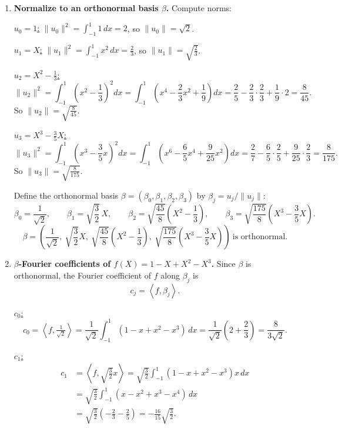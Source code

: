 \documentclass[12pt]{article}
\newcommand{\ip}[2]{\left\langle #1,#2\right\rangle}
\begin{document}
\begin{enumerate}[label=(\alph*)]
Thus Gram--Schmidt yields the orthogonal list
\[
\boxed{\,\bigl(1,\ X,\ X^2-\tfrac13,\ X^3-\tfrac35 X\bigr).\,}
\]

\item \textbf{Normalize to an orthonormal basis $\beta$.}
Compute norms:

\underline{$u_0=1$:} $\|u_0\|^2=\int_{-1}^1 1\,dx=2$, so $\|u_0\|=\sqrt2$.

\underline{$u_1=X$:} $\|u_1\|^2=\int_{-1}^1 x^2\,dx=\frac{2}{3}$, so $\|u_1\|=\sqrt{\frac{2}{3}}$.

\underline{$u_2=X^2-\frac13$:}
\[
\|u_2\|^2=\int_{-1}^1 \left(x^2-\frac13\right)^2dx
=\int_{-1}^1\left(x^4-\frac{2}{3}x^2+\frac{1}{9}\right)dx
=\frac{2}{5}-\frac{2}{3}\cdot\frac{2}{3}+\frac{1}{9}\cdot 2
=\frac{8}{45}.
\]
So $\|u_2\|=\sqrt{\frac{8}{45}}$.

\underline{$u_3=X^3-\frac35 X$:}
\[
\|u_3\|^2=\int_{-1}^1\left(x^3-\frac{3}{5}x\right)^2dx
=\int_{-1}^1\left(x^6-\frac{6}{5}x^4+\frac{9}{25}x^2\right)dx
=\frac{2}{7}-\frac{6}{5}\cdot\frac{2}{5}+\frac{9}{25}\cdot\frac{2}{3}
=\frac{8}{175}.
\]
So $\|u_3\|=\sqrt{\frac{8}{175}}$.

Define the orthonormal basis $\beta=(\beta_0,\beta_1,\beta_2,\beta_3)$ by $\beta_j=u_j/\|u_j\|$:
\[
\beta_0=\frac{1}{\sqrt2},\qquad
\beta_1=\sqrt{\frac{3}{2}}\,X,\qquad
\beta_2=\sqrt{\frac{45}{8}}\left(X^2-\frac13\right),\qquad
\beta_3=\sqrt{\frac{175}{8}}\left(X^3-\frac35 X\right).
\]
\[
\boxed{\,\beta=\left(\frac{1}{\sqrt2},\ \sqrt{\frac{3}{2}}X,\ \sqrt{\frac{45}{8}}\left(X^2-\frac13\right),\ \sqrt{\frac{175}{8}}\left(X^3-\frac35 X\right)\right)\ \text{is orthonormal.}\,}
\]

\item \textbf{$\beta$-Fourier coefficients of $f(X)=1-X+X^2-X^3$.}
Since $\beta$ is orthonormal, the Fourier coefficient of $f$ along $\beta_j$ is
\[
c_j=\ip{f}{\beta_j}.
\]

\underline{$c_0$:}
\[
c_0=\ip{f}{\tfrac{1}{\sqrt2}}=\frac{1}{\sqrt2}\int_{-1}^1 (1-x+x^2-x^3)\,dx
=\frac{1}{\sqrt2}\left(2+\frac{2}{3}\right)=\frac{8}{3\sqrt2}.
\]

\underline{$c_1$:}
\[
\begin{aligned}
c_1&=\ip{f}{\sqrt{\frac32}x}
=\sqrt{\frac32}\int_{-1}^1 (1-x+x^2-x^3)x\,dx\\
&=\sqrt{\frac32}\int_{-1}^1(x-x^2+x^3-x^4)\,dx\\
&=\sqrt{\frac32}\left(-\frac{2}{3}-\frac{2}{5}\right)
=-\frac{16}{15}\sqrt{\frac32}.
\end{aligned}
\]


\end{enumerate}
\end{document}
